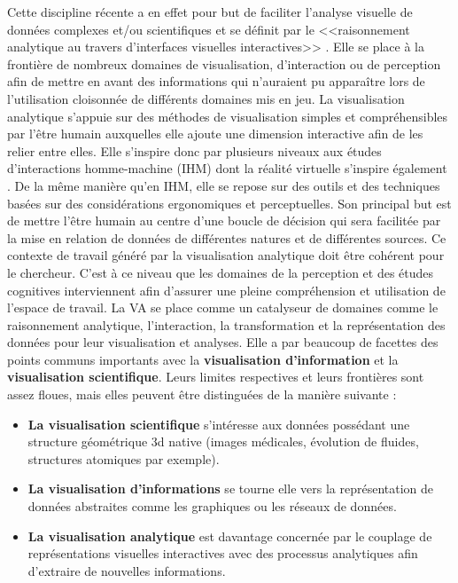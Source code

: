 Cette discipline récente a en effet pour but de faciliter l'analyse visuelle de données complexes et/ou scientifiques et se définit par le <<raisonnement analytique au travers d'interfaces visuelles interactives>> \cite{cook_illuminating_2005}. Elle se place à la frontière de nombreux domaines de visualisation, d'interaction ou de perception afin de mettre en avant des informations qui n'auraient pu apparaître lors de l'utilisation cloisonnée de différents domaines mis en jeu. La visualisation analytique s'appuie sur des méthodes de visualisation simples et compréhensibles par l'être humain auxquelles elle ajoute une dimension interactive afin de les relier entre elles. Elle s'inspire donc par plusieurs niveaux aux études d'interactions homme-machine (IHM) dont la réalité virtuelle s'inspire également \cite{arias-hernandez_visual_2011}. De la même manière qu'en IHM, elle se repose sur des outils et des techniques basées sur des considérations ergonomiques et perceptuelles. Son principal but est de mettre l'être humain au centre d'une boucle de décision qui sera facilitée par la mise en relation de données de différentes natures et de différentes sources. Ce contexte de travail généré par la visualisation analytique doit être cohérent pour le chercheur. C'est à ce niveau que les domaines de la perception et des études cognitives interviennent afin d'assurer une pleine compréhension et utilisation de l'espace de travail. La VA se place comme un catalyseur de domaines comme le raisonnement analytique, l'interaction, la transformation et la représentation des données pour leur visualisation et analyses.
Elle a par beaucoup de facettes des points communs importants avec la \textbf{visualisation d'information} et la \textbf{visualisation scientifique}. Leurs limites respectives et leurs frontières sont assez floues, mais elles peuvent être distinguées de la manière suivante :

\begin{itemize}
  \item \textbf{La visualisation scientifique} s'intéresse aux données possédant une structure géométrique 3d native (images médicales, évolution de fluides, structures atomiques par exemple).
  \item \textbf{La visualisation d'informations} se tourne elle vers la représentation de données abstraites comme les graphiques ou les réseaux de données.
  \item \textbf{La visualisation analytique} est davantage concernée par le couplage de représentations visuelles interactives avec des processus analytiques afin d'extraire de nouvelles informations.
\end{itemize}

